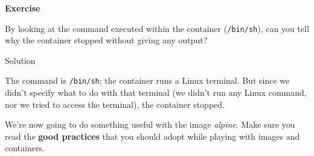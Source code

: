 \documentclass[
]{article}
\newenvironment{infobox}[1]
  {
  \begin{itemize}
  \renewcommand{\labelitemi}{
    \raisebox{-.7\height}[0pt][0pt]{
      
    }
  }
  \setlength{\fboxsep}{1em}
  \begin{whitebox}
  \item
  }
  {
  \end{whitebox}
  \end{itemize}
  }
\theoremstyle{definition}
\theoremstyle{definition}
\theoremstyle{definition}
\theoremstyle{remark}
\let\BeginKnitrBlock\begin \let\EndKnitrBlock\end
\begin{document}
\begin{infobox}{exercisebox}

\textbf{Exercise}

\BeginKnitrBlock{exercise}
\label{exr:unnamed-chunk-7}{\label{exr:unnamed-chunk-7} }By looking at the command executed within the container (\texttt{/bin/sh}),
can you tell why the container stopped without giving any output?
\EndKnitrBlock{exercise}

\end{infobox}

Solution

\begin{infobox}{exercisebox}
The command is \texttt{/bin/sh};
the container runs a Linux terminal.
But since we didn't specify what to do with that terminal
(we didn't run any Linux command, nor we tried to access the terminal),
the container stopped.

\end{infobox}

We're now going to do something useful with the image \emph{alpine}.
Make sure you read the \textbf{good practices} that you should
adopt while playing with images and containers.
\end{document}
